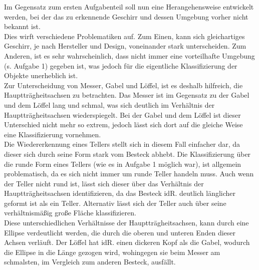 \documentclass{ezb}
\begin{document}
Im Gegensatz zum ersten Aufgabenteil soll nun eine Herangehensweise entwickelt werden, bei der das zu erkennende Geschirr und dessen Umgebung vorher nicht bekannt ist.\\
\linebreak
Dies wirft verschiedene Problematiken auf. Zum Einen, kann sich gleichartiges Geschirr, je nach Hersteller und Design, voneinander stark unterscheiden. Zum Anderen, ist es sehr wahrscheinlich, dass nicht immer eine vorteilhafte Umgebung (s. Aufgabe 1) gegeben ist, was jedoch für die eigentliche Klassifizierung der Objekte unerheblich ist.\\
\linebreak
Zur Unterscheidung von Messer, Gabel und Löffel, ist es deshalb hilfreich, die Hauptträgheitsachsen zu betrachten. Das Messer ist im Gegensatz zu der Gabel und dem Löffel lang und schmal, was sich deutlich im Verhältnis der Hauptträgheitsachsen wiederspiegelt. Bei der Gabel und dem Löffel ist dieser Unterschied nicht mehr so extrem, jedoch lässt sich dort auf die gleiche Weise eine Klassifizierung vornehmen.\\
\linebreak
Die Wiedererkennung eines Tellers stellt sich in diesem Fall einfacher dar, da dieser sich durch seine Form stark vom Besteck abhebt. Die Klassifizierung über die runde Form eines Tellers (wie es in Aufgabe 1 möglich war), ist allgemein problematisch, da es sich nicht immer um runde Teller handeln muss. Auch wenn der Teller nicht rund ist, lässt sich dieser über das Verhältnis der Hauptträgheitsachsen identifizieren, da das Besteck idR. deutlich länglicher geformt ist als ein Teller. Alternativ lässt sich der Teller auch über seine verhältnismäßig große Fläche klassifizieren.\\
\linebreak
Diese unterschiedlichen Verhältnisse der Hauptträgheitsachsen, kann durch eine Ellipse verdeutlicht werden, die durch die oberen und unteren Enden dieser Achsen verläuft. Der Löffel hat idR. einen dickeren Kopf als die Gabel, wodurch die Ellipse in die Länge gezogen wird, wohingegen sie beim Messer am schmalsten, im Vergleich zum anderen Besteck, ausfällt.

\end{document}
